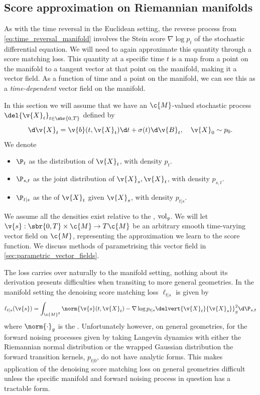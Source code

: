 \subsection{Score approximation on Riemannian manifolds}
\label{sec:riem-score-appr}

As with the time reversal in the Euclidean setting, the reverse process from \cref{eq:time_reversal_manifold} involves the Stein score \(\nabla \log p_t\) of the stochastic differential equation.
We will need to again approximate this quantity through a score matching loss.
This quantity at a specific time \(t\) is a map from a point on the manifold to a tangent vector at that point on the manifold, making it a vector field.
As a function of time and a point on the manifold, we can see this as a \emph{time-dependent} vector field on the manifold.

In this section we will assume that we have an \(\c{M}\)-valued stochastic process \(\del{\v{X}_t}_{t\in\sbr{0, T}}\) defined by
\[
	\d\v{X}_t = \v{b}(t, \v{X}_t) \d t + \sigma(t) \d\v{B}_t, \quad \v{X}_0 \sim p_0	
.\]
We denote 
\begin{itemize}
	\item \(\P_t\) as the distribution of \(\v{X}_t\), with density \(p_t\).
	\item \(\P_{s, t}\) as the joint distribution of \(\v{X}_s, \v{X}_t\), with density \(p_{s, t}\).
	\item \(\P_{t|s}\) as the  of \(\v{X}_t\) given \(\v{X}_s\), with density \(p_{t|s}\).
\end{itemize}
We assume all the densities exist relative to the , \(\operatorname{vol}_g\).
We will let \(\v{s}: \sbr{0, T} \x \c{M}\to T\c{M}\) be an arbitrary smooth time-varying vector field on \(\c{M}\), representing the approximation we learn to the score function.
We discuss methods of parametrising this vector field in \cref{sec:parametric_vector_fields}.

The  loss carries over naturally to the manifold setting, nothing about its derivation presents difficulties when transiting to more general geometries.
In the manifold setting the denoising score matching loss \(\ell_{t|s}\) is given by
\[
	\ell_{t|s}(\v{s}) = \int_{\c{M}^2} \norm{\v{s}(t, \v{X}_t) - \nabla\log p_{t|s}\delvert{\v{X}_t}{\v{X}_s}}_g^2 \d\P_{s, t}
\]
where \(\norm{\cdot}_g\) is the .
Unfortunately however, on general geometries, for the forward noising processes given by taking Langevin dynamics with either the Riemannian normal distribution or the wrapped Gaussian distribution the forward transition kernels, \(p_{t|0}\), do not have analytic forms.
This makes application of the denoising score matching loss on general geometries difficult unless the specific manifold and forward noising process in question has a tractable form.

